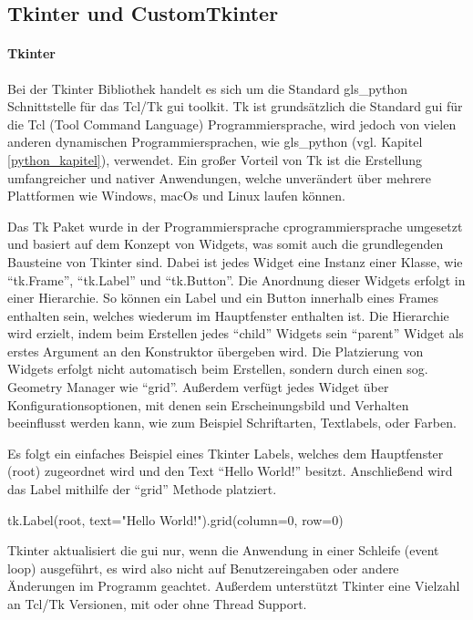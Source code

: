 \subsection{Tkinter und CustomTkinter}\label{tkinter_kapitel}
\paragraph{Tkinter}
Bei der Tkinter Bibliothek handelt es sich um die Standard \gls{gls_python} Schnittstelle für das Tcl/Tk \ac{gui} toolkit. Tk ist grundsätzlich die Standard \acs{gui} für die Tcl (Tool Command Language) Programmiersprache, wird jedoch von vielen anderen dynamischen Programmiersprachen, wie \zB \gls{gls_python} (vgl. Kapitel \ref{python_kapitel}), verwendet. Ein großer Vorteil von Tk ist die Erstellung umfangreicher und nativer Anwendungen, welche unverändert über mehrere Plattformen wie Windows, macOs und Linux laufen können. \cite[vgl.][]{Python_Software_Foundation_Tk:o.J., Tcl_Developer_Xchange:o.J.}

Das Tk Paket wurde in der Programmiersprache \gls{cprogrammiersprache} umgesetzt und basiert auf dem Konzept von Widgets, was somit auch die grundlegenden Bausteine von Tkinter sind. Dabei ist jedes Widget eine Instanz einer Klasse, wie \zB \enquote{tk.Frame}, \enquote{tk.Label} und \enquote{tk.Button}. Die Anordnung dieser Widgets erfolgt in einer Hierarchie. So können \zB ein Label und ein Button innerhalb eines Frames enthalten sein, welches wiederum im Hauptfenster enthalten ist. Die Hierarchie wird erzielt, indem beim Erstellen jedes \enquote{child} Widgets sein \enquote{parent} Widget als erstes Argument an den Konstruktor übergeben wird. Die Platzierung von Widgets erfolgt nicht automatisch beim Erstellen, sondern durch einen sog. Geometry Manager wie \enquote{grid}. Außerdem verfügt jedes Widget über Konfigurationsoptionen, mit denen sein Erscheinungsbild und Verhalten beeinflusst werden kann, wie zum Beispiel Schriftarten, Textlabels, oder Farben. \cite[vgl.][]{Python_Software_Foundation_Tk:o.J., Shipman:2013}

Es folgt ein einfaches Beispiel eines Tkinter Labels, welches dem Hauptfenster (root) zugeordnet wird und den Text \enquote{Hello World!} besitzt. Anschließend wird das Label mithilfe der \enquote{grid} Methode platziert. 
\begin{pythoncode}
tk.Label(root, text="Hello World!").grid(column=0, row=0)
\end{pythoncode}

Tkinter aktualisiert die \acs{gui} nur, wenn die Anwendung in einer Schleife (event loop) ausgeführt, es wird also nicht auf Benutzereingaben oder andere Änderungen im Programm geachtet. Außerdem unterstützt Tkinter eine Vielzahl an Tcl/Tk Versionen, mit oder ohne Thread Support. \cite[vgl.][]{Python_Software_Foundation_Tk:o.J.}

